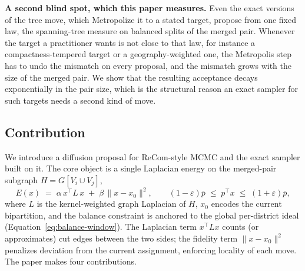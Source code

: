 \documentclass[11pt]{article}
\begin{document}
\textbf{A second blind spot, which this paper measures.} Even the
exact versions of the tree move, which Metropolize it to a stated
target, propose from one fixed law, the spanning-tree measure on
balanced splits of the merged pair. Whenever the target a practitioner
wants is not close to that law, for instance a compactness-tempered
target or a geography-weighted one, the Metropolis step has to undo
the mismatch on every proposal, and the mismatch grows with the size
of the merged pair. We show that the resulting acceptance decays
exponentially in the pair size, which is the structural reason an
exact sampler for such targets needs a second kind of move.

\subsection{Contribution}\label{sec:intro-contribution}

We introduce a diffusion proposal for ReCom-style MCMC and the exact
sampler built on it. The core object is a single Laplacian energy on
the merged-pair subgraph $H = G[V_i \cup V_j]$,
\begin{equation}\label{eq:core-energy}
  E(x) \;=\; \alpha\, x^\top L\, x \;+\; \beta\, \|x - x_0\|^2,
  \qquad
  (1 - \varepsilon)\bar p \;\le\; p^\top x \;\le\; (1+\varepsilon)\bar p,
\end{equation}
where $L$ is the kernel-weighted graph Laplacian of $H$, $x_0$ encodes
the current bipartition, and the balance constraint is anchored to the
global per-district ideal (Equation~\eqref{eq:balance-window}). The
Laplacian term $x^\top L x$ counts (or approximates) cut edges between
the two sides; the fidelity term $\|x - x_0\|^2$ penalizes deviation
from the current assignment, enforcing locality of each move. The
paper makes four contributions.
\end{document}
